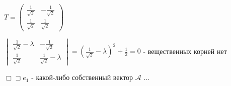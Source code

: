\documentclass[12pt]{article}
\begin{document}
    $\displaystyle T = \begin{pmatrix}\frac{1}{\sqrt{2}} & -\frac{1}{\sqrt{2}} \\ \frac{1}{\sqrt{2}} & \frac{1}{\sqrt{2}}\end{pmatrix}$

    $\displaystyle \begin{vmatrix}\frac{1}{\sqrt{2}} - \lambda & -\frac{1}{\sqrt{2}} \\ \frac{1}{\sqrt{2}} & \frac{1}{\sqrt{2}} - \lambda\end{vmatrix} =
    \left(\frac{1}{\sqrt{2}} - \lambda\right)^2 + \frac{1}{2} = 0$ - вещественных корней нет

    $\displaystyle \Box \sqsupset e_1$ - какой-либо собственный вектор $\mathcal{A}$ ...
\end{document}
